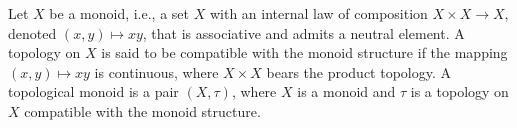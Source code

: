 Let $X$ be a monoid, i.e., a set $X$ with an internal law of composition $X \times X \to X$, denoted $(x, y) \mapsto xy$, that is associative and admits a neutral element. A topology on $X$ is said to be compatible with the monoid structure if the mapping $(x, y) \mapsto xy$ is continuous, where $X \times X$ bears the product topology. A topological monoid is a pair $(X, \tau)$, where $X$ is a monoid and $\tau$ is a topology on $X$ compatible with the monoid structure.
